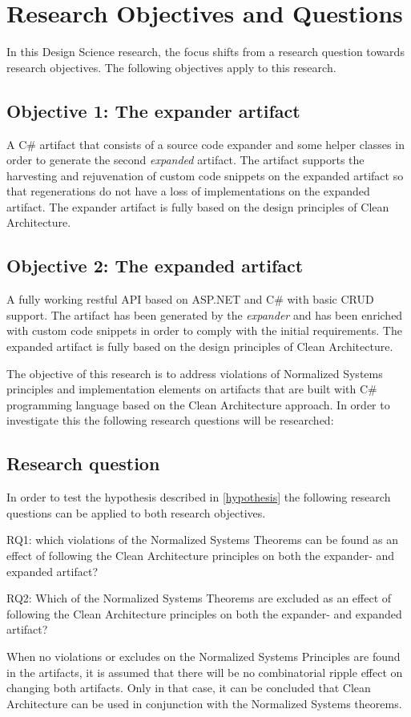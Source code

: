 \section{Research Objectives and Questions} \label{sec:research_questions}

In this Design Science research, the focus shifts from a research question towards
research objectives. The following objectives apply to this research.

\subsection{Objective 1: The expander artifact}
A C\# artifact that consists of a source code expander and some helper classes in order to
generate the second \emph{expanded} artifact. The artifact supports the harvesting and
rejuvenation of custom code snippets on the expanded artifact so that regenerations do not
have a loss of implementations on the expanded artifact. The expander artifact is fully
based on the design principles of Clean Architecture.

\subsection{Objective 2: The expanded artifact}
A fully working restful API based on ASP.NET and C\# with basic CRUD support. The artifact
has been generated by the \emph{expander} and has been enriched with custom code snippets
in order to comply with the initial requirements. The expanded artifact is fully based on
the design principles of Clean Architecture.

The objective of this research is to address violations of Normalized Systems principles
and implementation elements on artifacts that are built with C\# programming language
based on the Clean Architecture approach. In order to investigate this the following
research questions will be researched:

\subsection{Research question}
In order to test the hypothesis described in \ref{hypothesis} the following research
questions can be applied to both research objectives.

RQ1: which violations of the Normalized Systems Theorems can be found as an effect of
following the Clean Architecture principles on both the expander- and expanded artifact?

RQ2: Which of the Normalized Systems Theorems are excluded as an effect of following the
Clean Architecture principles on both the expander- and expanded artifact?

When no violations or excludes on the Normalized Systems Principles are found in the
artifacts, it is assumed that there will be no combinatorial ripple effect on changing
both artifacts. Only in that case, it can be concluded that Clean Architecture can be
used in conjunction with the Normalized Systems theorems. 
